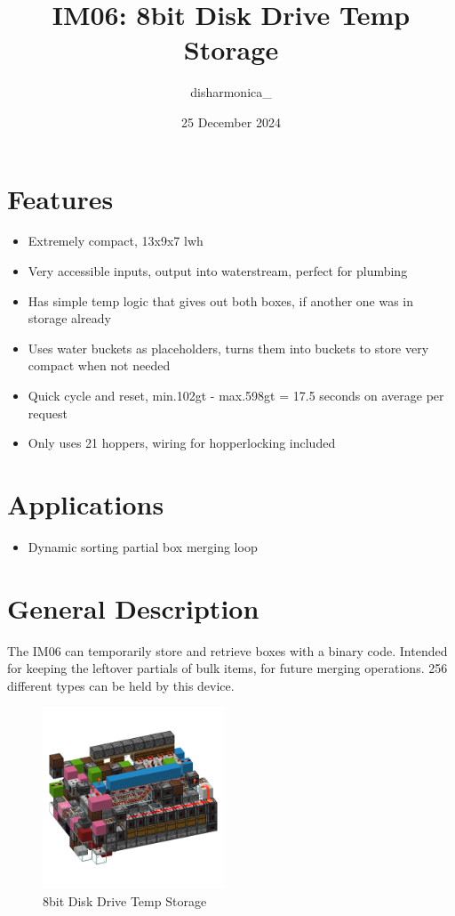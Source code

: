 \documentclass[10pt]{datasheet}
\title{IM06: 8bit Disk Drive Temp Storage}
\author{disharmonica\_}
\date{25 December 2024}
\begin{document}
\maketitle

\section{Features}
\begin{itemize}
\item{Extremely compact, 13x9x7 lwh}
\item{Very accessible inputs, output into waterstream, perfect for plumbing}
\item{Has simple temp logic that gives out both boxes, if another one was in storage already}
\item{Uses water buckets as placeholders, turns them into buckets to store very compact when not needed}
\item{Quick cycle and reset, min.102gt - max.598gt = 17.5 seconds on average per request}
\item{Only uses 21 hoppers, wiring for hopperlocking included}
\end{itemize}

\section{Applications}

\begin{itemize}
\item{Dynamic sorting partial box merging loop}
\end{itemize}

\section{General Description}
The IM06 can temporarily store and retrieve boxes with a binary code. Intended for keeping the leftover partials of bulk items, for future merging operations. 256 different types can be held by this device.

\vfill\break

\begin{figure}[H]
    \centering
    \includegraphics[width=0.48\textwidth]{area_render_35_.png}
    \caption{\centering 8bit Disk Drive Temp Storage}
\end{figure}
\end{document}
